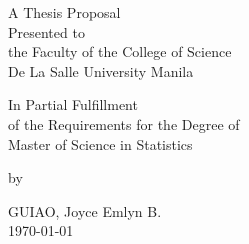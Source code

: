 %
%
%                 

\begin{titlepage}
\centering



\vspace{1.75cm}
A Thesis Proposal\\
Presented to\\
the Faculty of the College of Science\\
De La Salle University Manila

\vspace{1.75cm}
In Partial Fulfillment\\
of the Requirements for the Degree of\\
Master of Science in Statistics

\vspace{1.75cm}
by\\
\vspace{1cm}

GUIAO, Joyce Emlyn B.  \\



\vspace{1.75cm}
\today
\end{titlepage}
